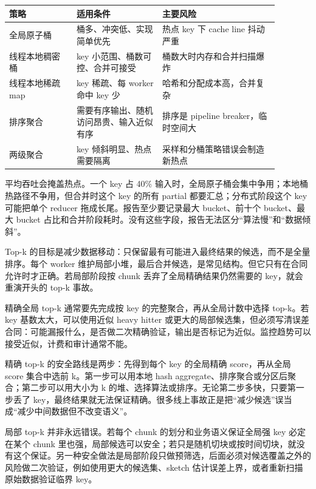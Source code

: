\begin{center}
\begin{tabular}{p{0.22\linewidth}p{0.28\linewidth}p{0.38\linewidth}}
\toprule
策略 & 适用条件 & 主要风险 \\
\midrule
全局原子桶 & 桶多、冲突低、实现简单优先 & 热点 key 下 cache line 抖动严重 \\
线程本地稠密桶 & key 小范围、桶数可控、合并可接受 & 桶数大时内存和合并扫描爆炸 \\
线程本地稀疏 map & key 稀疏、每 worker 命中 key 少 & 哈希和分配成本高，合并复杂 \\
排序聚合 & 需要有序输出、随机访问昂贵、输入近似有序 & 排序是 pipeline breaker，临时空间大 \\
两级聚合 & key 倾斜明显、热点需要隔离 & 采样和分桶策略错误会制造新热点 \\
\bottomrule
\end{tabular}
\end{center}

平均吞吐会掩盖热点。一个 key 占 40\% 输入时，全局原子桶会集中争用；本地桶热路径不争用，但合并时这个 key 的所有 partial 都要汇总；分布式阶段这个 key 可能把单个 reducer 拖成长尾。报告至少要记录最大 bucket、前十个 bucket、最大 bucket 占比和合并阶段耗时。没有这些字段，报告无法区分“算法慢”和“数据倾斜”。

Top-k 的目标是减少数据移动：只保留最有可能进入最终结果的候选，而不是全量排序。每个 worker 维护局部小堆，最后合并候选，是常见结构。但它只有在合同允许时才正确。若局部阶段按 chunk 丢弃了全局精确结果仍然需要的 key，就会重演开头的 top-k 事故。

精确全局 top-k 通常要先完成按 key 的完整聚合，再从全局计数中选择 top-k。若 key 基数太大，可以使用近似 heavy hitter 或更大的局部候选集，但必须写清误差合同：可能漏报什么，是否做二次精确验证，输出是否标记为近似。监控趋势可以接受近似，计费和审计通常不能。

精确 top-k 的安全路线是两步：先得到每个 key 的全局精确 score，再从全局 score 集合中选前 k。第一步可以用本地 hash aggregate、排序聚合或分区后聚合；第二步可以用大小为 k 的堆、选择算法或排序。无论第二步多快，只要第一步丢了 key，最终结果就无法保证精确。很多线上事故正是把“减少候选”误当成“减少中间数据但不改变语义”。

局部 top-k 并非永远错误。若每个 chunk 的划分和业务语义保证全局强 key 必定在某个 chunk 里也强，局部候选可以安全；若只是随机切块或按时间切块，就没有这个保证。另一种安全做法是局部阶段只做预筛选，后面必须对候选覆盖之外的风险做二次验证，例如使用更大的候选集、sketch 估计误差上界，或者重新扫描原始数据验证临界 key。

